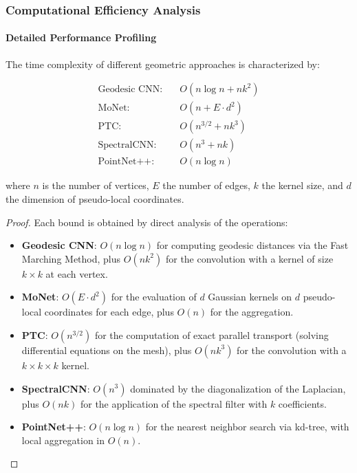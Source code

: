 \subsubsection{Computational Efficiency Analysis}\label{subsubsec:eficiencia_computacional}

\paragraph{Detailed Performance Profiling}

\begin{proposition}\label{prop:complejidad_aproximaciones_geometricas}
The time complexity of different geometric approaches is characterized by:

\begin{align}
\text{Geodesic CNN}: &\quad O(n \log n + nk^2) \\
\text{MoNet}: &\quad O(n + E \cdot d^2) \\
\text{PTC}: &\quad O(n^{3/2} + nk^3) \\
\text{SpectralCNN}: &\quad O(n^3 + nk) \\
\text{PointNet++}: &\quad O(n \log n)
\end{align}

where $n$ is the number of vertices, $E$ the number of edges, $k$ the kernel size, and $d$ the dimension of pseudo-local coordinates.
\end{proposition}

\begin{proof}
Each bound is obtained by direct analysis of the operations:
\begin{itemize}
    \item \textbf{Geodesic CNN}: $O(n \log n)$ for computing geodesic distances via the Fast Marching Method, plus $O(nk^2)$ for the convolution with a kernel of size $k \times k$ at each vertex.
    \item \textbf{MoNet}: $O(E \cdot d^2)$ for the evaluation of $d$ Gaussian kernels on $d$ pseudo-local coordinates for each edge, plus $O(n)$ for the aggregation.
    \item \textbf{PTC}: $O(n^{3/2})$ for the computation of exact parallel transport (solving differential equations on the mesh), plus $O(nk^3)$ for the convolution with a $k \times k \times k$ kernel.
    \item \textbf{SpectralCNN}: $O(n^3)$ dominated by the diagonalization of the Laplacian, plus $O(nk)$ for the application of the spectral filter with $k$ coefficients.
    \item \textbf{PointNet++}: $O(n \log n)$ for the nearest neighbor search via kd-tree, with local aggregation in $O(n)$.
\end{itemize}
\end{proof}

